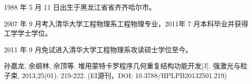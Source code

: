 \begin{resume}


  1988 年 5 月 11 日出生于黑龙江省省齐齐哈尔市。
  
  2007 年 9 月考入清华大学工程物理系工程物理专业，2011年 7 月本科毕业并获得工学学士学位。
  
  2011 年 9 月免试进入清华大学工程物理系攻读硕士学位至今。


  \begin{enumerate}[{[}1{]}]
  \item 孙嘉龙, 余纲林, 佘顶等. 堆用蒙特卡罗程序几何重复结构功能开发[J]. 强激光与粒子束, 2013,25(01): 219-222.
  (EI源刊，DOI: 10.3788/HPLPB20132501.219)
  \end{enumerate}

\end{resume}
